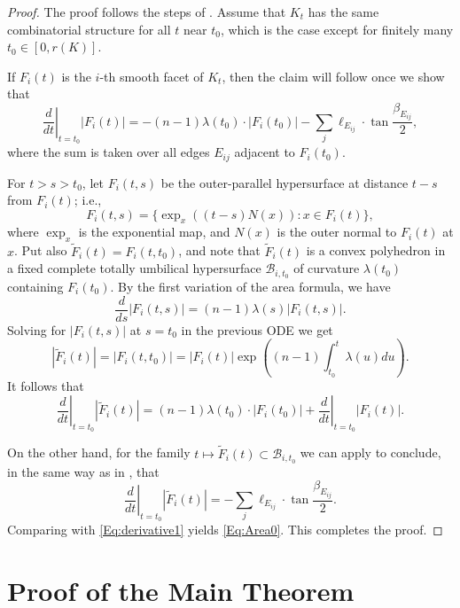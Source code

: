 \documentclass[12pt]{amsart}
\renewcommand{\tilde}{\widetilde}
\theoremstyle{theorem}
\theoremstyle{Intro}
\theoremstyle{definition}
\theoremstyle{remark}
\theoremstyle{claim}
\numberwithin{equation}{section}
\begin{document}
\begin{proof}
    The proof follows the steps of \cite[Section 3.1]{DT}. Assume that $K_t$ has the same combinatorial structure for all $t$ near $t_0$, which is the case except for finitely many $t_0\in [0,r(K)]$.

    If $F_i(t)$ is the $i$-th smooth facet of $K_t$, then the claim will follow once we show that
    \begin{equation}
    \label{Eq:Area0}
    \left.\frac{d}{dt}\right|_{t=t_0}|F_i(t)| = -(n-1)\lambda(t_0) \cdot |F_i(t_0)| - \sum_{j} \ell_{E_{ij}} \cdot \tan \frac{\beta_{E_{ij}}}{2},
    \end{equation}
where the sum is taken over all edges $E_{ij}$ adjacent to $F_i(t_0)$.

For $t>s > t_0$, let $F_i(t,s)$ be the outer-parallel hypersurface at distance $t-s$ from $F_i(t)$; i.e.,
\[
F_i(t,s) = \{\exp_x((t-s) N(x)) : x \in F_i(t)\},
\]
where $\exp_x$ is the exponential map, and $N(x)$ is the outer normal to $F_i(t)$ at $x$. Put also $\tilde F_i(t)=F_i(t,t_0)$, and note that $\tilde F_i(t)$ is a convex polyhedron in a fixed complete totally umbilical hypersurface $\mathcal B_{i,t_0}$ of curvature $\lambda(t_0)$ containing $F_i(t_0)$. By the first variation of the area formula, we have
\[
\frac{d}{ds}| F_i(t,s)|=(n-1)\lambda(s)|F_i(t,s)|.
\]
Solving for $|F_i(t,s)|$ at $s = t_0$ in the previous ODE  we get 
\[
|\tilde F_i(t)|=|F_i(t,t_0)|=|F_i(t)|\exp\left((n-1)\int_{t_0}^t \lambda(u)du\right). 
\]
It follows that
\begin{equation}\label{Eq:derivative1}
\left.\frac{d}{dt}\right|_{t=t_0}|\tilde F_i(t)| = (n-1) \lambda(t_0) \cdot |F_i(t_0)| + \left.\frac{d}{dt}\right|_{t=t_0}|F_i(t)|.
\end{equation}



On the other hand, for the family $t \mapsto \tilde F_i(t) \subset \mathcal B_{i,t_0}$ we can apply \cite[Theorem 3.3]{DT} to conclude, in the same way as in \cite[Lemma 3.6]{DT}, that
\[
\left.\frac{d}{dt}\right|_{t=t_0}|\tilde F_i(t)| = - \sum_{j} \ell_{E_{ij}} \cdot \tan \frac{\beta_{E_{ij}}}{2}.
\]
Comparing with \eqref{Eq:derivative1} yields \eqref{Eq:Area0}. This completes the proof.\end{proof}

\section{Proof of the Main Theorem}
\end{document}
